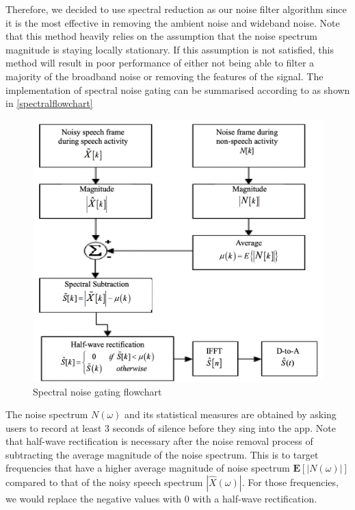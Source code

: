Therefore, we decided to use spectral reduction as our noise filter algorithm since it is the most effective in removing the ambient noise 
and wideband noise. Note that this method heavily relies on the assumption that the noise spectrum magnitude is staying locally 
stationary. If this assumption is not satisfied, this method will result in poor performance of either not being able to filter a majority of 
the broadband noise or removing the features of the signal.
The implementation of spectral noise gating can be summarised according to \cite{spectralflowchart} as shown in \autoref{spectralflowchart}
\begin{figure}
	\centering
	\includegraphics[scale=0.35]{Figures/spectralprocess.png}
	\caption{Spectral noise gating flowchart}
	\label{spectralflowchart}
\end{figure}
The noise spectrum $N(\omega)$ and its statistical measures are obtained by asking users to record at least 3 seconds of silence 
before they sing into the app.
Note that half-wave rectification is necessary after the noise removal process of subtracting the average magnitude of the noise spectrum.
This is to target frequencies that have a higher average magnitude of noise spectrum $\textbf{E}[|N(\omega)|]$ compared to that of 
the noisy speech spectrum $|\hat{X}(\omega)|$. For those frequencies, we would replace the negative values with 0 with a half-wave 
rectification.

